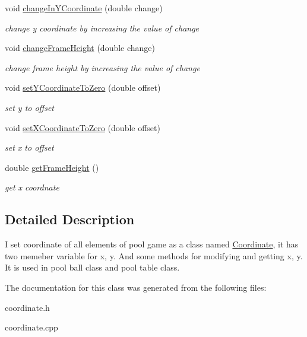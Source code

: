 \begin{DoxyCompactItemize}
void \mbox{\hyperlink{class_coordinate_a4a7edaafaee90471fa91f9e4720960a0}{change\+In\+Y\+Coordinate}} (double change)
\begin{DoxyCompactList}\small\item\em change y coordinate by increasing the value of change \end{DoxyCompactList}\item 
\mbox{\label{class_coordinate_a3d903978af2a8f566328f5ef25b09a0d}} 
void \mbox{\hyperlink{class_coordinate_a3d903978af2a8f566328f5ef25b09a0d}{change\+Frame\+Height}} (double change)
\begin{DoxyCompactList}\small\item\em change frame height by increasing the value of change \end{DoxyCompactList}\item 
\mbox{\label{class_coordinate_a3fa2a351ac8952bce7574aabb42b05e0}} 
void \mbox{\hyperlink{class_coordinate_a3fa2a351ac8952bce7574aabb42b05e0}{set\+Y\+Coordinate\+To\+Zero}} (double offset)
\begin{DoxyCompactList}\small\item\em set y to offset \end{DoxyCompactList}\item 
\mbox{\label{class_coordinate_a9344e8989dada3bf791b5dde42544fa3}} 
void \mbox{\hyperlink{class_coordinate_a9344e8989dada3bf791b5dde42544fa3}{set\+X\+Coordinate\+To\+Zero}} (double offset)
\begin{DoxyCompactList}\small\item\em set x to offset \end{DoxyCompactList}\item 
\mbox{\label{class_coordinate_a9263be4ba7bf18ab8a67e1aafdf6dc09}} 
double \mbox{\hyperlink{class_coordinate_a9263be4ba7bf18ab8a67e1aafdf6dc09}{get\+Frame\+Height}} ()
\begin{DoxyCompactList}\small\item\em get x coordnate \end{DoxyCompactList}\end{DoxyCompactItemize}


\subsection{Detailed Description}
I set coordinate of all elements of pool game as a class named \mbox{\hyperlink{class_coordinate}{Coordinate}}, it has two memeber variable for x, y. And some methods for modifying and getting x, y. It is used in pool ball class and pool table class. 

The documentation for this class was generated from the following files\+:\begin{DoxyCompactItemize}
\item 
coordinate.\+h\item 
coordinate.\+cpp\end{DoxyCompactItemize}

